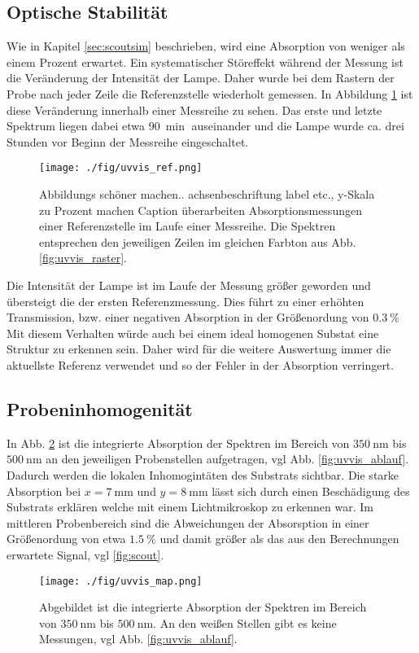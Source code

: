 \subsection{Optische Stabilität}
\label{sec:uvvis_stabilitaet}
Wie in Kapitel \ref{sec:scoutsim} beschrieben, wird eine Absorption von weniger als einem Prozent erwartet.
Ein systematischer Störeffekt während der Messung ist die Veränderung der Intensität der Lampe.
Daher wurde bei dem Rastern der Probe nach jeder Zeile die Referenzstelle wiederholt gemessen.
In Abbildung \ref{fig:uvvis_ref} ist diese Veränderung innerhalb einer Messreihe zu sehen.
Das erste und letzte Spektrum liegen dabei etwa $\SI{90}{\min}$ auseinander und die Lampe wurde ca. drei Stunden vor Beginn der Messreihe eingeschaltet.
\begin{figure}
    \centering
    \texttt{[image: ./fig/uvvis\_ref.png]}
    \caption{Abbildungs schöner machen.. achsenbeschriftung label etc., y-Skala zu Prozent machen Caption überarbeiten
    Absorptionsmessungen einer Referenzstelle im Laufe einer Messreihe.
    Die Spektren entsprechen den jeweiligen Zeilen im gleichen Farbton aus Abb. \ref{fig:uvvis_raster}.}
    \label{fig:uvvis_ref}
\end{figure}
Die Intensität der Lampe ist im Laufe der Messung größer geworden und übersteigt die der ersten Referenzmessung. 
Dies führt zu einer erhöhten Transmission, bzw. einer negativen Absorption in der Größenordung von $\SI{0.3}{\%}$
Mit diesem Verhalten würde auch bei einem ideal homogenen Substat eine Struktur zu erkennen sein.
Daher wird für die weitere Auswertung immer die aktuellste Referenz verwendet und so der Fehler in der Absorption verringert.
\subsection{Probeninhomogenität}
In Abb. \ref{fig:uvvis_map} ist die integrierte Absorption der Spektren im Bereich von $\SI{350}{\nm}$ bis $\SI{500}{\nm}$ an den jeweiligen Probenstellen aufgetragen, vgl Abb. \ref{fig:uvvis_ablauf}.
Dadurch werden die lokalen Inhomogintäten des Substrats sichtbar.
Die starke Absorption bei $x=\SI{7}{\mm}$ und $y=\SI{8}{\mm}$ lässt sich durch einen Beschädigung des Substrats erklären welche mit einem Lichtmikroskop zu erkennen war.
Im mittleren Probenbereich sind die Abweichungen der Absorsption in einer Größenordung von etwa $\SI{1.5}{\%}$ und damit größer als das aus den Berechnungen erwartete Signal, vgl \ref{fig:scout}.
\begin{figure}
    \centering
    \texttt{[image: ./fig/uvvis\_map.png]}
    \caption{Abgebildet ist die integrierte Absorption der Spektren im Bereich von $\SI{350}{\nm}$ bis $\SI{500}{\nm}$. An den weißen Stellen gibt es keine Messungen, vgl Abb. \ref{fig:uvvis_ablauf}.}
    \label{fig:uvvis_map}
\end{figure}

